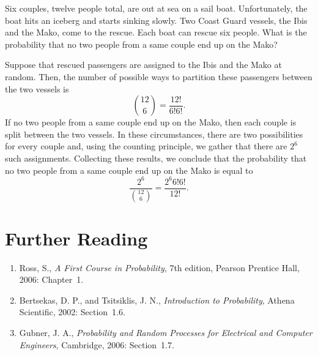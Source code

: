 \begin{example}
Six couples, twelve people total, are out at sea on a sail boat.
Unfortunately, the boat hits an iceberg and starts sinking slowly.
Two Coast Guard vessels, the Ibis and the Mako, come to the rescue.
Each boat can rescue six people.
What is the probability that no two people from a same couple end up on the Mako?

Suppose that rescued passengers are assigned to the Ibis and the Mako at random.
Then, the number of possible ways to partition these passengers between the two vessels is
\begin{equation*}
\binom{12}{6} = \frac{12!}{6! 6!} .
\end{equation*}
If no two people from a same couple end up on the Mako, then each couple is split between the two vessels.
In these circumstances, there are two possibilities for every couple and, using the counting principle, we gather that there are $2^6$ such assignments.
Collecting these results, we conclude that the probability that no two people from a same couple end up on the Mako is equal to
\begin{equation*}
\frac{2^6}{\binom{12}{6}} = \frac{2^6 6! 6!}{12!} .
\end{equation*}
\end{example}


\section*{Further Reading}

\begin{small}
\begin{enumerate}
\item Ross, S., \emph{A First Course in Probability}, 7th edition, Pearson Prentice Hall, 2006: Chapter~1.
\item Bertsekas, D. P., and Tsitsiklis, J. N., \emph{Introduction to Probability}, Athena Scientific, 2002: Section~1.6.
\item Gubner, J. A., \emph{Probability and Random Processes for Electrical and Computer Engineers}, Cambridge, 2006: Section~1.7.
\end{enumerate}
\end{small}

